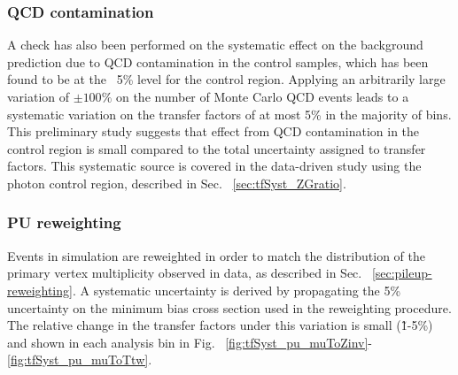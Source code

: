 \subsubsection*{QCD contamination}
\label{sec:tfSyst_qcdCont}

A check has also been performed on the systematic effect on the
background prediction due to QCD contamination in the control samples,
which has been found to be at the ~5\% level for the \gj
control region. Applying an arbitrarily large variation of $\pm
100\%$ on the number of Monte Carlo QCD events leads to a systematic
variation on the transfer factors of at most 5\% in the majority of bins.
This preliminary study suggests that effect from QCD
contamination in the \gj control region is small compared 
to the total uncertainty assigned to transfer factors. 
This systematic source is covered in the data-driven study  
using the photon control region, described in Sec. ~\ref{sec:tfSyst_ZGratio}.



\subsubsection*{PU reweighting}
\label{sec:tfSyst_pu}

Events in simulation are reweighted in order to match the distribution 
of the primary vertex multiplicity observed in data, as described in Sec. ~\ref{sec:pileup-reweighting}.
A systematic uncertainty is derived by propagating 
the 5\% uncertainty on the minimum bias cross section used in the reweighting procedure. 
The relative change in the transfer factors under this variation is
small (\~1-5\%)
and shown in each analysis bin in Fig. ~\ref{fig:tfSyst_pu_muToZinv}-\ref{fig:tfSyst_pu_muToTtw}.

